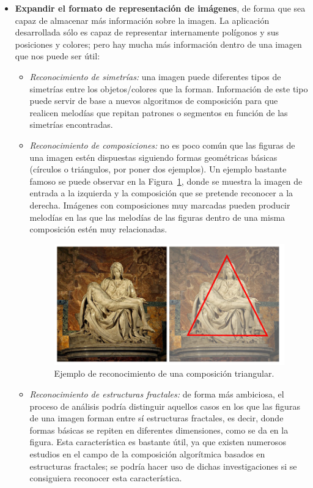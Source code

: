 \begin{itemize}
\item\textbf{Expandir el formato de representación de imágenes}, de forma que sea capaz de almacenar más información sobre la imagen. La aplicación desarrollada sólo es capaz de representar internamente polígonos y sus posiciones y colores; pero hay mucha más información dentro de una imagen que nos puede ser útil:

	\begin{itemize}
	
		\item\textit{Reconocimiento de simetrías:} una imagen puede diferentes tipos de simetrías entre los objetos/colores que la forman. Información de este tipo puede servir de base a nuevos algoritmos de composición para que realicen melodías que repitan patrones o segmentos en función de las simetrías encontradas.
		
		\item\textit{Reconocimiento de composiciones:} no es poco común que las figuras de una imagen estén dispuestas siguiendo formas geométricas básicas (círculos o triángulos, por poner dos ejemplos). Un ejemplo bastante famoso se puede observar en la Figura~\ref{fig:composition}, donde se muestra la imagen de entrada a la izquierda y la composición que se pretende reconocer a la derecha. Imágenes con composiciones muy marcadas pueden producir melodías en las que las melodías de las figuras dentro de una misma composición estén muy relacionadas.\\
			
			\begin{figure}[!htbp]
			\centering
			\includegraphics[scale=0.47]{graphics/composition2.png}
			\caption{Ejemplo de reconocimiento de una composición triangular.}
			\label{fig:composition}
			\end{figure}
		
		\item\textit{Reconocimiento de estructuras fractales:} de forma más ambiciosa, el proceso de análisis podría distinguir aquellos casos en los que las figuras de una imagen forman entre sí estructuras fractales, es decir, donde formas básicas se repiten en diferentes dimensiones, como se da en la figura. Esta característica es bastante útil, ya que existen numerosos estudios en el campo de la composición algorítmica basados en estructuras fractales; se podría hacer uso de dichas investigaciones si se consiguiera reconocer esta característica.
		

\end{itemize}
\end{itemize}
